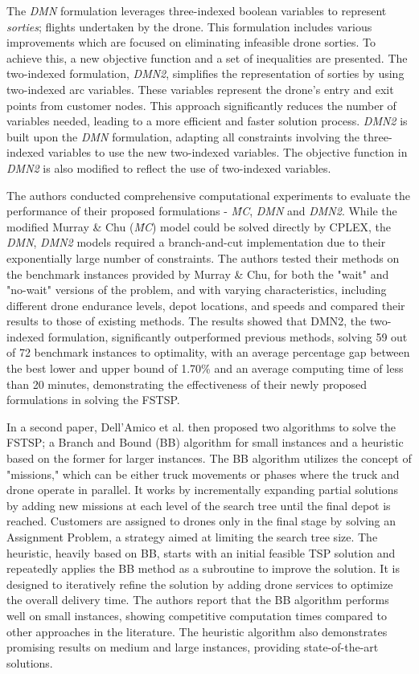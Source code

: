 \documentclass{article}
\begin{document}
	\par
	The \textit{DMN} formulation leverages three-indexed boolean variables to represent \textit{sorties}; flights undertaken by the drone. This formulation includes various improvements which are focused on eliminating infeasible drone sorties. To achieve this, a new objective function and a set of inequalities are presented.
	The two-indexed formulation, \textit{DMN2}, simplifies the representation of sorties by using two-indexed arc variables. These variables represent the drone's entry and exit points from customer nodes. This approach significantly reduces the number of variables needed, leading to a more efficient and faster solution process. \textit{DMN2} is built upon the \textit{DMN} formulation, adapting all constraints involving the three-indexed variables to use the new two-indexed variables. The objective function in \textit{DMN2} is also modified to reflect the use of two-indexed variables. 
	\par
	The authors conducted comprehensive computational experiments to evaluate the performance of their proposed formulations - \textit{\={MC}}, \textit{DMN} and \textit{DMN2}. While the modified Murray \& Chu (\textit{\={MC}}) model could be solved directly by CPLEX, the \textit{DMN}, \textit{DMN2} models required a branch-and-cut implementation due to their exponentially large number of constraints. The authors tested their methods on the benchmark instances provided by Murray \& Chu, for both the "wait" and "no-wait" versions of the problem, and with varying characteristics, including different drone endurance levels, depot locations, and speeds and compared their results to those of existing methods. The results showed that DMN2, the two-indexed formulation, significantly outperformed previous methods, solving 59 out of 72 benchmark instances to optimality, with an average percentage gap between the best lower and upper bound of 1.70\% and an average computing time of less than 20 minutes, demonstrating the effectiveness of their newly proposed formulations in solving the FSTSP.
	\par
	In a second paper, Dell'Amico et al. \cite{DellAmico2021} then proposed two algorithms to solve the FSTSP; a Branch and Bound (BB) algorithm for small instances and a heuristic based on the former for larger instances. The BB algorithm utilizes the concept of "missions," which can be either truck movements or phases where the truck and drone operate in parallel. It works by incrementally expanding partial solutions by adding new missions at each level of the search tree until the final depot is reached. Customers are assigned to drones only in the final stage by solving an Assignment Problem, a strategy aimed at limiting the search tree size. The heuristic, heavily based on BB, starts with an initial feasible TSP solution and repeatedly applies the BB method as a subroutine to improve the solution. It is designed to iteratively refine the solution by adding drone services to optimize the overall delivery time. The authors report that the BB algorithm performs well on small instances, showing competitive computation times compared to other approaches in the literature. The heuristic algorithm also demonstrates promising results on medium and large instances, providing state-of-the-art solutions.
\end{document}

